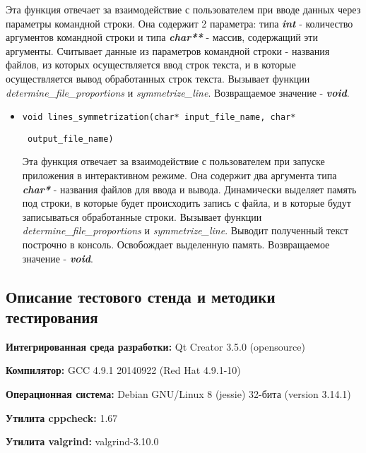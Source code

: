 \documentclass[12pt,a4paper]{report}
\begin{document}
\begin{enumerate}
\begin{itemize}
Эта функция отвечает за взаимодействие с пользователем при вводе данных через параметры командной строки. Она содержит 2 параметра: типа \textbf{\textit{int}} - количество аргументов командной строки и типа \textbf{\textit{char**}} - массив, содержащий эти аргументы. Считывает данные из параметров командной строки - названия файлов, из которых осуществляется ввод строк текста, и в которые осуществляется вывод обработанных строк текста. Вызывает функции \textit{determine\_file\_proportions} и \textit{symmetrize\_line}. Возвращаемое значение - \textit{\textbf{void}}.
\end{itemize}

\begin{itemize}
\item \verb-void lines_symmetrization(char* input_file_name, char* -

\begin{flushright}
\verb- output_file_name)-
\end{flushright}

Эта функция отвечает за взаимодействие с пользователем при запуске приложения в интерактивном режиме. Она содержит два аргумента типа \textbf{\textit{char*} }- названия файлов для ввода и вывода.  Динамически выделяет память под строки, в которые будет происходить запись с файла, и в которые будут записываться обработанные строки. Вызывает функции \textit{determine\_file\_proportions} и \textit{symmetrize\_line}. Выводит полученный текст построчно в консоль. Освобождает выделенную память. Возвращаемое значение - \textit{\textbf{void}}.
\end{itemize}


\end{enumerate}
\subsection{Описание тестового стенда и методики тестирования}

\begin{flushleft}
\textbf{Интегрированная среда разработки:} Qt Creator 3.5.0 (opensource)

\textbf{Компилятор:} GCC 4.9.1 20140922 (Red Hat 4.9.1-10)

\textbf{Операционная система:} Debian GNU/Linux 8 (jessie) 32-бита (version 3.14.1)

\textbf{Утилита cppcheck:} 1.67

\textbf{Утилита valgrind:} valgrind-3.10.0
\end{flushleft}
\end{document}
